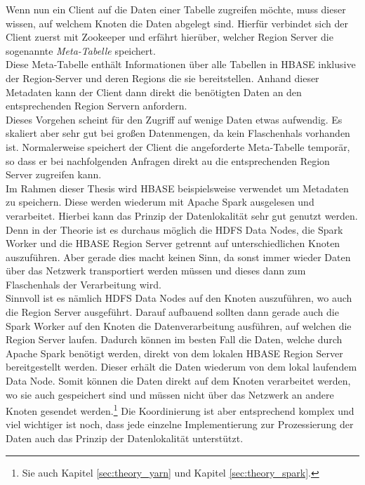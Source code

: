 \noindent
Wenn nun ein Client auf die Daten einer Tabelle zugreifen möchte, muss dieser wissen, auf welchem Knoten die Daten abgelegt sind. Hierfür verbindet sich der Client zuerst mit Zookeeper und erfährt hierüber, welcher Region Server die sogenannte \textit{Meta-Tabelle} speichert.\cite[S. 579]{hadoop_definitive_guide}\\
Diese Meta-Tabelle enthält Informationen über alle Tabellen in HBASE inklusive der Region-Server und deren Regions die sie bereitstellen. Anhand dieser Metadaten kann der Client dann direkt die benötigten Daten an den entsprechenden Region Servern anfordern.\\
Dieses Vorgehen scheint für den Zugriff auf wenige Daten etwas aufwendig. Es skaliert aber sehr gut bei großen Datenmengen, da kein Flaschenhals vorhanden ist. Normalerweise speichert der Client die angeforderte Meta-Tabelle temporär, so dass er bei nachfolgenden Anfragen direkt au die entsprechenden Region Server zugreifen kann.\\ 

\noindent
Im Rahmen dieser Thesis wird HBASE beispielsweise verwendet um Metadaten zu speichern. Diese werden wiederum mit Apache Spark ausgelesen und verarbeitet. Hierbei kann das Prinzip der Datenlokalität sehr gut genutzt werden. Denn in der Theorie ist es durchaus möglich die HDFS Data Nodes, die Spark Worker und die HBASE Region Server getrennt auf unterschiedlichen Knoten auszuführen. Aber gerade dies macht keinen Sinn, da sonst immer wieder Daten über das Netzwerk transportiert werden müssen und dieses dann zum Flaschenhals der Verarbeitung wird.\\
Sinnvoll ist es nämlich HDFS Data Nodes auf den Knoten auszuführen, wo auch die Region Server ausgeführt. Darauf aufbauend sollten dann gerade auch die Spark Worker auf den Knoten die Datenverarbeitung ausführen, auf welchen die Region Server laufen. Dadurch können im besten Fall die Daten, welche durch Apache Spark benötigt werden, direkt von dem lokalen HBASE Region Server bereitgestellt werden. Dieser erhält die Daten wiederum von dem lokal laufendem Data Node. Somit können die Daten direkt auf dem Knoten verarbeitet werden, wo sie auch gespeichert sind und müssen nicht über das Netzwerk an andere Knoten gesendet werden.\footnote{Sie auch Kapitel \ref{sec:theory_yarn} und Kapitel \ref{sec:theory_spark}.} Die Koordinierung ist aber entsprechend komplex und viel wichtiger ist noch, dass jede einzelne Implementierung zur Prozessierung der Daten auch das Prinzip der Datenlokalität unterstützt.\\

